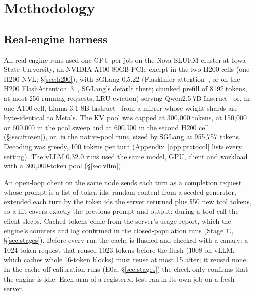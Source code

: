 \section{Methodology}\label{sec:method}

\subsection{Real-engine harness}\label{sec:harness}
All real-engine runs used one GPU per job on the Nova SLURM cluster at Iowa State University, an NVIDIA A100 80GB PCIe except in the two H200 cells (one H200 NVL; \S\ref{sec:h200}), with SGLang 0.5.22 (FlashInfer attention~\citep{ye2025flashinfer}, or on the H200 FlashAttention~3~\citep{shah2024flashattention3}, SGLang's default there; chunked prefill of 8192 tokens, at most 256 running requests, LRU eviction) serving Qwen2.5-7B-Instruct~\citep{qwen2024qwen25} or, in one A100 cell, Llama-3.1-8B-Instruct~\citep{grattafiori2024llama3} from a mirror whose weight shards are byte-identical to Meta's. The KV pool was capped at 300,000 tokens, at 150,000 or 600,000 in the pool sweep and at 600,000 in the second H200 cell (\S\ref{sec:frozen}), or, in the native-pool runs, sized by SGLang at 955,757 tokens. Decoding was greedy, 100 tokens per turn (Appendix~\ref{app:protocol} lists every setting). The vLLM 0.32.0 runs used the same model, GPU, client and workload with a 300,000-token pool (\S\ref{sec:vllm}).

An open-loop client on the same node sends each turn as a completion request whose prompt is a list of token ids: random content from a seeded generator, extended each turn by the token ids the server returned plus 550 new tool tokens, so a hit covers exactly the previous prompt and output; during a tool call the client sleeps. Cached tokens come from the server's usage report, which the engine's counters and log confirmed in the closed-population runs (Stage~C, \S\ref{sec:stages}). Before every run the cache is flushed and checked with a canary: a 1024-token request that reused 1023 tokens before the flush (1008 on vLLM, which caches whole 16-token blocks) must reuse at most 15 after; it reused none. In the cache-off calibration runs (E0a, \S\ref{sec:stages}) the check only confirms that the engine is idle. Each arm of a registered test ran in its own job on a fresh server.

